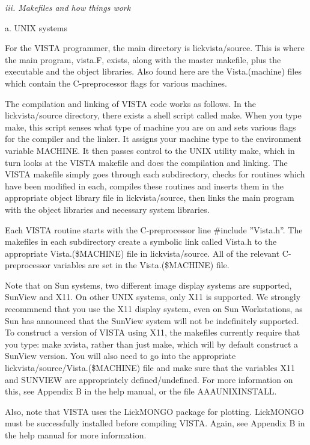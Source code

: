 \centerline{\it iii. Makefiles and how things work}

\centerline{a. UNIX systems}

	For the VISTA programmer, the main directory is lickvista/source.
This is where the main program, vista.F, exists, along with the master
makefile, plus the executable and the object libraries. Also found here
are the Vista.(machine) files which contain the C-preprocessor flags for
various machines.

	The compilation and linking of VISTA code works as follows. In the 
lickvista/source directory, there exists a shell script called make. When
you type make, this script senses what type of machine you are on and
sets various flags for the compiler and the linker. It assigns your machine
type to the environment variable MACHINE. It then passes control to the
UNIX utility make, which in turn looks at the VISTA makefile and does
the compilation and linking. The VISTA makefile simply goes through each
subdirectory, checks for routines which have been modified in each, 
compiles these routines and inserts them in the appropriate object library
file in lickvista/source, then links the main program with the object
libraries and necessary system libraries.

	Each VISTA routine starts with the C-preprocessor line 
\#include ''Vista.h''.  The makefiles in each subdirectory create a symbolic
link called Vista.h to the appropriate Vista.(\$MACHINE) file in 
lickvista/source.   All of the relevant C-preprocessor variables are set
in the Vista.(\$MACHINE) file.

	Note that on Sun systems, two different image display systems are
supported, SunView and X11. On other UNIX systems, only X11 is supported.
We strongly recommnend that you use the X11 display system, even on Sun
Workstations, as Sun has announced that the SunView system will not be
indefinitely supported.  To construct a version of VISTA using X11, the
makefiles currently require that you type:  make xvista, rather than just
make, which will by default construct a SunView version. You will also
need to go into the appropriate lickvista/source/Vista.(\$MACHINE) file
and make sure that the variables X11 and SUNVIEW are appropriately
defined/undefined. For more information
on this, see Appendix B in the help manual, or the file AAAUNIXINSTALL. 

	Also, note that VISTA uses the LickMONGO package for plotting. 
LickMONGO must be successfully installed before compiling VISTA. Again,
see Appendix B in the help manual for more information.

